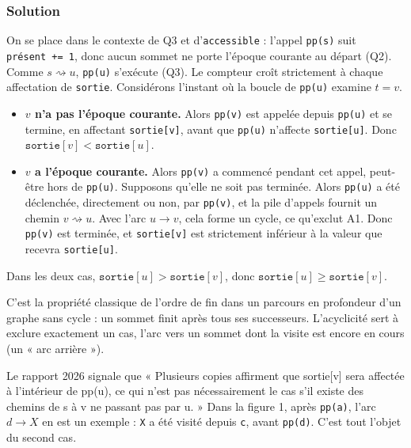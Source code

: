 \documentclass[11pt,a4paper]{article}
\providecommand{\tightlist}{\setlength{\itemsep}{0pt}\setlength{\parskip}{0pt}}
\begin{document}
\hypertarget{solution-3}{%
\subsubsection{Solution}\label{solution-3}}

On se place dans le contexte de Q3 et d'\texttt{accessible} : l'appel \texttt{pp(s)} suit \texttt{présent\ +=\ 1}, donc aucun sommet ne porte l'époque courante au départ (Q2). Comme \(s\rightsquigarrow u\), \texttt{pp(u)} s'exécute (Q3). Le compteur croît strictement à chaque affectation de \texttt{sortie}. Considérons l'instant où la boucle de \texttt{pp(u)} examine \(t=v\).

\begin{itemize}
\tightlist
\item
  \textbf{\(v\) n'a pas l'époque courante.} Alors \texttt{pp(v)} est appelée depuis \texttt{pp(u)} et se termine, en affectant \texttt{sortie{[}v{]}}, avant que \texttt{pp(u)} n'affecte \texttt{sortie{[}u{]}}. Donc \(\texttt{sortie}[v]<\texttt{sortie}[u]\).
\item
  \textbf{\(v\) a l'époque courante.} Alors \texttt{pp(v)} a commencé pendant cet appel, peut-être hors de \texttt{pp(u)}. Supposons qu'elle ne soit pas terminée. Alors \texttt{pp(u)} a été déclenchée, directement ou non, par \texttt{pp(v)}, et la pile d'appels fournit un chemin \(v\rightsquigarrow u\). Avec l'arc \(u\to v\), cela forme un cycle, ce qu'exclut A1. Donc \texttt{pp(v)} est terminée, et \texttt{sortie{[}v{]}} est strictement inférieur à la valeur que recevra \texttt{sortie{[}u{]}}.
\end{itemize}

Dans les deux cas, \(\texttt{sortie}[u]>\texttt{sortie}[v]\), donc \textbf{\(\texttt{sortie}[u]\ge\texttt{sortie}[v]\)}.

\begin{methode}

C'est la propriété classique de l'ordre de fin dans un parcours en profondeur d'un graphe sans cycle : un sommet finit après tous ses successeurs. L'acyclicité sert à exclure exactement un cas, l'arc vers un sommet dont la visite est encore en cours (un « arc arrière »).

\end{methode}

\begin{piege}

Le rapport 2026 signale que « Plusieurs copies affirment que sortie{[}v{]} sera affectée à l'intérieur de pp(u), ce qui n'est pas nécessairement le cas s'il existe des chemins de s à v ne passant pas par u. » Dans la figure 1, après \texttt{pp(\textquotesingle{}a\textquotesingle{})}, l'arc \(d\to X\) en est un exemple : \texttt{X} a été visité depuis \texttt{c}, avant \texttt{pp(\textquotesingle{}d\textquotesingle{})}. C'est tout l'objet du second cas.

\end{piege}
\end{document}
